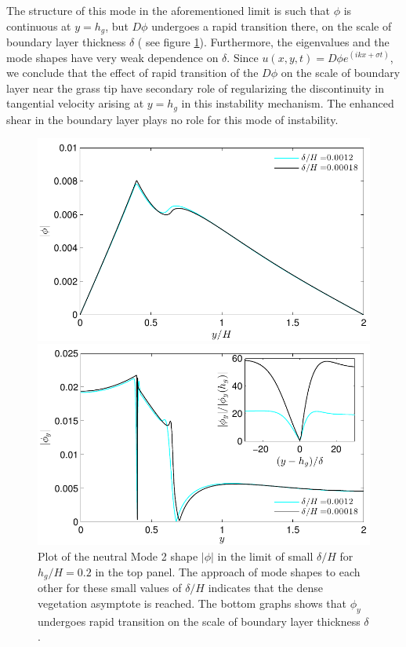\documentclass[12pt]{report}   %
\newcommand{\hg}{h_g}
\newcommand{\Rey}{{R}}
\newcommand{\Ndg}{\tilde{N}_g}
\begin{document}
The structure of this mode in the aforementioned limit is such that $\phi$ is continuous at $y=h_g$, but $D\phi$ undergoes a rapid transition there, on the scale of boundary layer thickness $\delta$ ( see figure \ref{Asymptotic_mode2}).
Furthermore, the eigenvalues and the mode shapes have very weak dependence on $\delta$. Since $u(x,y,t) =  D\phi e^{(ikx+\sigma t)}$, we conclude that the effect of rapid transition of the $D\phi$ on the scale of boundary layer near the grass tip have secondary role of regularizing the discontinuity in tangential velocity arising at $y=\hg$ in this instability mechanism.
The enhanced shear in the boundary layer plays no role for this mode of instability.
\begin{figure}
\centerline{\includegraphics[width=1\linewidth]{AsymptoticPhiNoshear}}
\centerline{\includegraphics[width=0.95\linewidth]{AsymptoticPhiyNoshear}}
\caption{
Plot of the neutral Mode 2 shape $|\phi|$ in the limit of small $\delta/H$ for $\hg/H=0.2$ in the top panel.
The approach of mode shapes to each other for these small values of $\delta/H$ indicates that the dense vegetation asymptote is reached. 
The bottom graphs shows that $\phi_y$ undergoes rapid transition on the scale of boundary layer thickness $\delta$.
}
\label{Asymptotic_mode2}
\end{figure}
\end{document}
